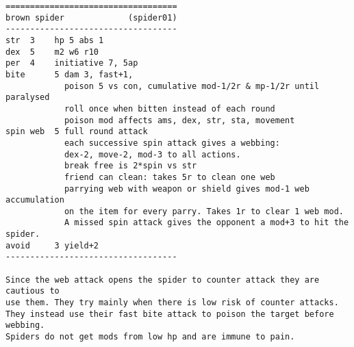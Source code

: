 \goodbreak \begin{samepage} \small \begin{verbatim}
===================================
brown spider             (spider01)
-----------------------------------
str  3    hp 5 abs 1
dex  5    m2 w6 r10
per  4    initiative 7, 5ap
bite      5 dam 3, fast+1,
            poison 5 vs con, cumulative mod-1/2r & mp-1/2r until paralysed
            roll once when bitten instead of each round
            poison mod affects ams, dex, str, sta, movement
spin web  5 full round attack
            each successive spin attack gives a webbing:
            dex-2, move-2, mod-3 to all actions.
            break free is 2*spin vs str
            friend can clean: takes 5r to clean one web
            parrying web with weapon or shield gives mod-1 web accumulation
            on the item for every parry. Takes 1r to clear 1 web mod.
            A missed spin attack gives the opponent a mod+3 to hit the spider.
avoid     3 yield+2
-----------------------------------

Since the web attack opens the spider to counter attack they are cautious to
use them. They try mainly when there is low risk of counter attacks.
They instead use their fast bite attack to poison the target before webbing.
Spiders do not get mods from low hp and are immune to pain.
\end{verbatim} \normalsize \end{samepage}

\

